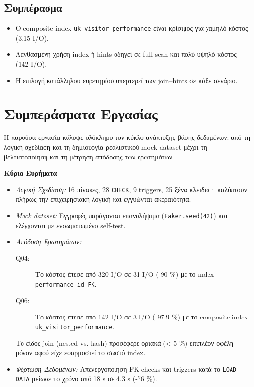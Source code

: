 \documentclass[a4paper,12pt]{article}
\begin{document}
\subsection{Συμπέρασμα}
\begin{itemize}
  \item Ο composite index \texttt{uk\_visitor\_performance} είναι κρίσιμος για χαμηλό κόστος (3.15 I/O).
  \item Λανθασμένη χρήση index ή hints οδηγεί σε full scan και πολύ υψηλό κόστος (142 I/O).
  \item Η επιλογή κατάλληλου ευρετηρίου υπερτερεί των join–hints σε κάθε σενάριο.
\end{itemize}

\bigskip

\section{Συμπεράσματα Εργασίας}
\label{sec:conclusions}

Η παρούσα εργασία κάλυψε ολόκληρο τον κύκλο ανάπτυξης βάσης δεδομένων:
από τη λογική σχεδίαση και τη δημιουργία ρεαλιστικού mock dataset
μέχρι τη βελτιστοποίηση και τη μέτρηση απόδοσης των ερωτημάτων.

\bigskip
\textbf{Κύρια Ευρήματα}
\begin{itemize}
  \item \emph{Λογική Σχεδίαση:}  
        16 πίνακες, 28 \texttt{CHECK}, 9 triggers, 25 ξένα κλειδιά·
        καλύπτουν πλήρως την επιχειρησιακή λογική και εγγυώνται ακεραιότητα.
  \item \emph{Mock dataset:}  
        Εγγραφές παράγονται επαναλήψιμα (\texttt{Faker.seed(42)}) 
        και ελέγχονται με ενσωματωμένο self-test.
  \item \emph{Απόδοση Ερωτημάτων:}
        \begin{description}
          \item[Q04:] Το κόστος έπεσε από 320 I/O σε 31 I/O (-90 \%) με το index \texttt{performance\_id\_FK}.
          \item[Q06:] Το κόστος έπεσε από 142 I/O σε 3 I/O (-97.9 \%) με το composite index \texttt{uk\_visitor\_performance}.
        \end{description}
        Το είδος join (nested vs. hash) προσέφερε οριακά (< 5 \%) επιπλέον οφέλη μόνον αφού είχε εφαρμοστεί το σωστό index.
  \item \emph{Φόρτωση Δεδομένων:}  
        Απενεργοποίηση FK checks και triggers κατά το \texttt{LOAD DATA}
        μείωσε το χρόνο από 18 s σε 4.3 s (-76 \%).
\end{itemize}
\appendix
\end{document}
